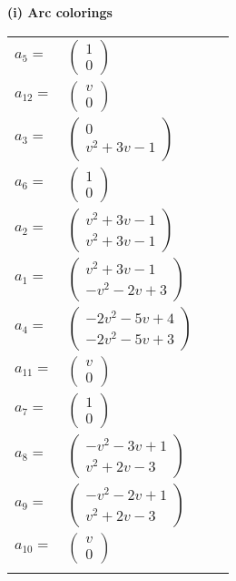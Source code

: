 \documentclass[1p]{elsarticle_modified}
\theoremstyle{definition}
\begin{document}
\flushleft \textbf{(i) Arc colorings}\\
\begin{tabular}{m{7pt} m{180pt} m{7pt} m{180pt} }
\flushright $a_{5}=$&$\begin{pmatrix}1\\0\end{pmatrix}$ \\
\flushright $a_{12}=$&$\begin{pmatrix}v\\0\end{pmatrix}$ \\
\flushright $a_{3}=$&$\begin{pmatrix}0\\v^2+3 v-1\end{pmatrix}$ \\
\flushright $a_{6}=$&$\begin{pmatrix}1\\0\end{pmatrix}$ \\
\flushright $a_{2}=$&$\begin{pmatrix}v^2+3 v-1\\v^2+3 v-1\end{pmatrix}$ \\
\flushright $a_{1}=$&$\begin{pmatrix}v^2+3 v-1\\- v^2-2 v+3\end{pmatrix}$ \\
\flushright $a_{4}=$&$\begin{pmatrix}-2 v^2-5 v+4\\-2 v^2-5 v+3\end{pmatrix}$ \\
\flushright $a_{11}=$&$\begin{pmatrix}v\\0\end{pmatrix}$ \\
\flushright $a_{7}=$&$\begin{pmatrix}1\\0\end{pmatrix}$ \\
\flushright $a_{8}=$&$\begin{pmatrix}- v^2-3 v+1\\v^2+2 v-3\end{pmatrix}$ \\
\flushright $a_{9}=$&$\begin{pmatrix}- v^2-2 v+1\\v^2+2 v-3\end{pmatrix}$ \\
\flushright $a_{10}=$&$\begin{pmatrix}v\\0\end{pmatrix}$\\&\end{tabular}
\end{document}
